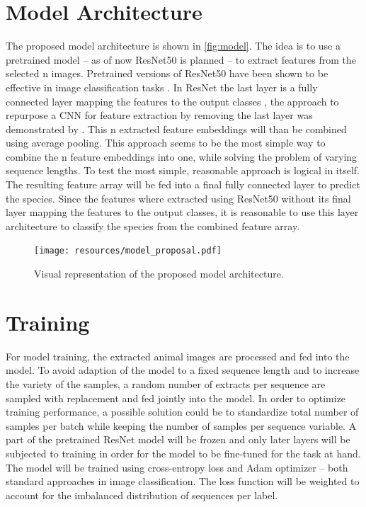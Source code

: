 \documentclass{article}
\begin{document}
\section*{Model Architecture} %

The proposed model architecture is shown in \autoref{fig:model}. The idea is to use a pretrained model 
-- as of now ResNet50 is planned -- to extract features from the selected n images.
Pretrained versions of ResNet50 have been shown to be effective in image classification tasks
\autocite{bintaislamAnimalSpeciesRecognition2023}.
In ResNet the last layer is a fully connected layer mapping the features to the output classes 
\autocite{heDeepResidualLearning2015}, the approach to repurpose a CNN for feature extraction by removing the last
layer was demonstrated by \textcite{razavianCNNFeaturesOfftheshelf2014}.
This n extracted feature embeddings will than be combined using average pooling. 
This approach seems to be the most simple way to combine the
n feature embeddings into one, while solving the problem of varying sequence lengths.
To test the most simple, reasonable approach is logical in itself.
The resulting feature array will be fed into a final fully connected
layer to predict the species. Since the features where extracted using ResNet50 without its final layer
mapping the features to the output classes, it is reasonable to use this layer architecture to classify the species
from the combined feature array.

\begin{figure}[ht]
  \centering
  \texttt{[image: resources/model\_proposal.pdf]}
  \caption{Visual representation of the proposed model architecture.}
  \label{fig:model}
\end{figure}

\section*{Training} %

For model training, the extracted animal images are processed and fed into the model. To avoid adaption of the model 
to a fixed sequence length and to increase the variety of the samples, a random number of extracts per sequence are 
sampled with replacement and fed jointly into the model. In order to optimize training performance, a possible
solution could be to standardize total number of samples per batch while keeping the number of samples per sequence
variable. A part of the pretrained ResNet model will be frozen and only later layers will be subjected
to training in order for the model to be fine-tuned for the task at hand.
The model will be trained using cross-entropy loss and Adam optimizer -- both standard approaches 
in image classification. The loss function will be weighted to account for the imbalanced distribution of sequences
per label.
\end{document}
